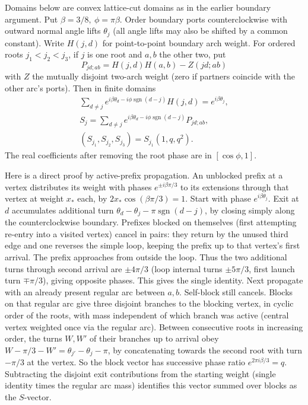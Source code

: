 Domains below are convex lattice-cut domains as in the earlier boundary argument. Put \(\beta=3/8,\ \phi=\pi\beta\). Order boundary ports counterclockwise with outward normal angle lifts \(\theta_j\) (all angle lifts may also be shifted by a common constant). Write \(H(j,d)\) for point-to-point boundary arch weight. For ordered roots \(j_1<j_2<j_3\), if \(j\) is one root and \(a,b\) the other two, put
\[
 P_{jd;ab}=H(j,d)H(a,b)-Z(jd;ab)
\]
with \(Z\) the mutually disjoint two-arch weight (zero if partners coincide with the other arc's ports). Then in finite domains
\begin{equation}
\begin{gathered}
 \sum_{d\ne j}e^{i\beta\theta_d-i\phi\operatorname{sgn}(d-j)}H(j,d)=e^{i\beta\theta_j},\\
 S_j=\sum_{d\ne j}e^{i\beta\theta_d-i\phi\operatorname{sgn}(d-j)}P_{jd;ab},\\
 (S_{j_1},S_{j_2},S_{j_3})=S_{j_1}(1,q,q^2).
\end{gathered}\label{c4:BW}
\end{equation}
The real coefficients after removing the root phase are in \([\cos\phi,1]\).

Here is a direct proof by active-prefix propagation. An unblocked prefix at a vertex distributes its weight with phases \(e^{\pm i\beta\pi/3}\) to its extensions through that vertex at weight \(x_*\) each, by \(2x_*\cos(\beta\pi/3)=1\). Start with phase \(e^{i\beta\theta_j}\). Exit at \(d\) accumulates additional turn \(\theta_d-\theta_j-\pi\operatorname{sgn}(d-j)\), by closing simply along the counterclockwise boundary. Prefixes blocked on themselves (first attempting re-entry into a visited vertex) cancel in pairs: they return by the unused third edge and one reverses the simple loop, keeping the prefix up to that vertex's first arrival. The prefix approaches from outside the loop. Thus the two additional turns through second arrival are \(\pm4\pi/3\) (loop internal turns \(\pm5\pi/3\), first launch turn \(\mp\pi/3\)), giving opposite phases. This gives the single identity. Next propagate with an already present regular arc between \(a,b\). Self-block still cancels. Blocks on that regular arc give three disjoint branches to the blocking vertex, in cyclic order of the roots, with mass independent of which branch was active (central vertex weighted once via the regular arc). Between consecutive roots in increasing order, the turns \(W,W'\) of their branches up to arrival obey \(W-\pi/3-W'=\theta_{j'}-\theta_j-\pi\), by concatenating towards the second root with turn \(-\pi/3\) at the vertex. So the block vector has successive phase ratio \(e^{2\pi i\beta/3}=q\). Subtracting the disjoint exit contributions from the starting weight (single identity times the regular arc mass) identifies this vector summed over blocks as the \(S\)-vector.

